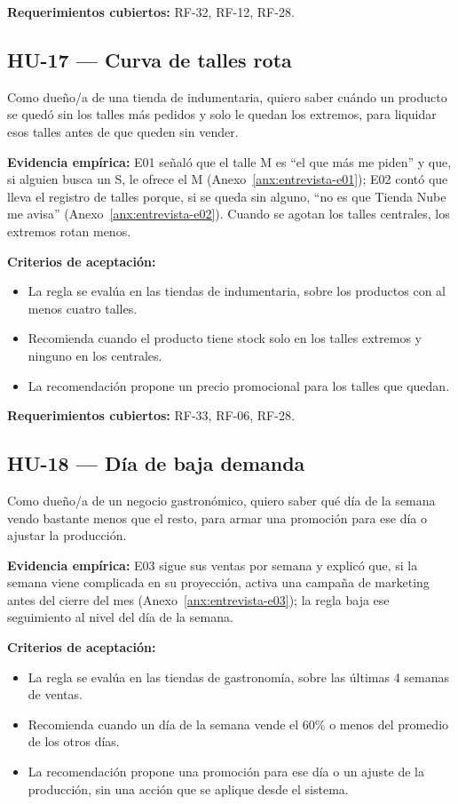 \noindent\textbf{Requerimientos cubiertos:} RF-32, RF-12, RF-28.

\subsection{HU-17 --- Curva de talles rota}
\label{sec:hu-17}

Como dueño/a de una tienda de indumentaria, quiero saber cuándo un producto se quedó sin los talles más pedidos y solo le quedan los extremos, para liquidar esos talles antes de que queden sin vender.

\noindent\textbf{Evidencia empírica:} E01 señaló que el talle M es \enquote{el que más me piden} y que, si alguien busca un S, le ofrece el M (Anexo~\ref{anx:entrevista-e01}); E02 contó que lleva el registro de talles porque, si se queda sin alguno, \enquote{no es que Tienda Nube me avisa} (Anexo~\ref{anx:entrevista-e02}). Cuando se agotan los talles centrales, los extremos rotan menos.

\noindent\textbf{Criterios de aceptación:}
\begin{itemize}
    \item La regla se evalúa en las tiendas de indumentaria, sobre los productos con al menos cuatro talles.
    \item Recomienda cuando el producto tiene stock solo en los talles extremos y ninguno en los centrales.
    \item La recomendación propone un precio promocional para los talles que quedan.
\end{itemize}

\noindent\textbf{Requerimientos cubiertos:} RF-33, RF-06, RF-28.

\subsection{HU-18 --- Día de baja demanda}
\label{sec:hu-18}

Como dueño/a de un negocio gastronómico, quiero saber qué día de la semana vendo bastante menos que el resto, para armar una promoción para ese día o ajustar la producción.

\noindent\textbf{Evidencia empírica:} E03 sigue sus ventas por semana y explicó que, si la semana viene complicada en su proyección, activa una campaña de marketing antes del cierre del mes (Anexo~\ref{anx:entrevista-e03}); la regla baja ese seguimiento al nivel del día de la semana.

\noindent\textbf{Criterios de aceptación:}
\begin{itemize}
    \item La regla se evalúa en las tiendas de gastronomía, sobre las últimas 4 semanas de ventas.
    \item Recomienda cuando un día de la semana vende el 60\% o menos del promedio de los otros días.
    \item La recomendación propone una promoción para ese día o un ajuste de la producción, sin una acción que se aplique desde el sistema.
\end{itemize}

